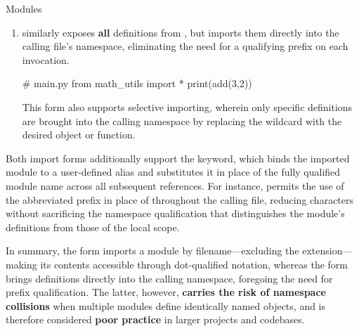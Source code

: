 \documentclass[10pt]{article}
\begin{document}
\begin{core}{Modules}
\begin{enumerate}
      To import only specific definitions rather than the module in its entirety, the  syntax may be used in place of the bare  form.

      \item {} similarly exposes \textbf{all} definitions from , but imports them directly into the calling file's namespace, eliminating the need for a qualifying prefix on each invocation.

      \begin{pyconsole}

        # main.py
        from math_utils import *
        print(add(3,2))

      \end{pyconsole}

      This form also supports selective importing, wherein only specific definitions are brought into the calling namespace by replacing the wildcard \textcode{*} with the desired object or function.

    \end{enumerate}

    Both import forms additionally support the  keyword, which binds the imported module to a user-defined alias and substitutes it in place of the fully qualified module name across all subsequent references. For instance,  permits the use of the abbreviated prefix  in place of  throughout the calling file, reducing characters without sacrificing the namespace qualification that distinguishes the module's definitions from those of the local scope.

    In summary, the  form imports a module by filename---excluding the  extension---making its contents accessible through dot-qualified notation, whereas the  form brings definitions directly into the calling namespace, foregoing the need for prefix qualification. The latter, however, \textbf{carries the risk of namespace collisions} when multiple modules define identically named objects, and is therefore considered \textbf{poor practice} in larger projects and codebases.

  \end{core}
\end{document}

